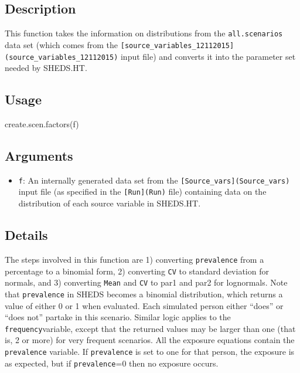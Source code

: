 \documentclass[
]{article}
\newenvironment{Shaded}{\begin{snugshade}}{\end{snugshade}}
\newcommand{\FunctionTok}[1]{\textcolor[rgb]{0.00,0.00,0.00}{#1}}
\newcommand{\NormalTok}[1]{#1}
\providecommand{\tightlist}{%
  \setlength{\itemsep}{0pt}\setlength{\parskip}{0pt}}
\begin{document}
\hypertarget{description-11}{%
\subsection{Description}\label{description-11}}

This function takes the information on distributions from the
\texttt{all.scenarios} data set (which comes from the
\texttt{{[}source\_variables\_12112015{]}(source\_variables\_12112015)}
input file) and converts it into the parameter set needed by SHEDS.HT.

\hypertarget{usage-11}{%
\subsection{Usage}\label{usage-11}}

\begin{Shaded}
\begin{Highlighting}[]
\FunctionTok{create.scen.factors}\NormalTok{(f)}
\end{Highlighting}
\end{Shaded}

\hypertarget{arguments-8}{%
\subsection{Arguments}\label{arguments-8}}

\begin{itemize}
\tightlist
\item
  \texttt{f}: An internally generated data set from the
  \texttt{{[}Source\_vars{]}(Source\_vars)} input file (as specified in
  the \texttt{{[}Run{]}(Run)} file) containing data on the distribution
  of each source variable in SHEDS.HT.
\end{itemize}

\hypertarget{details-6}{%
\subsection{Details}\label{details-6}}

The steps involved in this function are 1) converting
\texttt{prevalence} from a percentage to a binomial form, 2) converting
\texttt{CV} to standard deviation for normals, and 3) converting
\texttt{Mean} and \texttt{CV} to par1 and par2 for lognormals. Note that
\texttt{prevalence} in SHEDS becomes a binomial distribution, which
returns a value of either 0 or 1 when evaluated. Each simulated person
either ``does'' or ``does not'' partake in this scenario. Similar logic
applies to the \texttt{frequency}variable, except that the returned
values may be larger than one (that is, 2 or more) for very frequent
scenarios. All the exposure equations contain the \texttt{prevalence}
variable. If \texttt{prevalence} is set to one for that person, the
exposure is as expected, but if \texttt{prevalence}=0 then no exposure
occurs.
\end{document}
